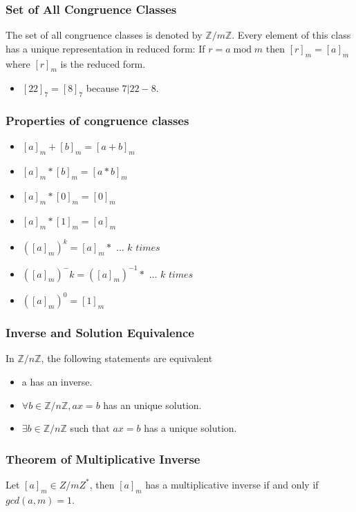 \documentclass{article}
\begin{document}
\subsubsection{Set of All Congruence Classes} 
\begin{tcolorbox}[width=12.1cm, leftrule=3mm]
The set of all congruence classes is denoted by $ \mathbb{Z} / m\mathbb{Z} $. Every element of this class has a unique representation in reduced form: If $ r = a \;\mathrm{mod}\; m $ then $ [r]_m = [a]_m $ where $ [r]_m $ is the reduced form.
\begin{itemize}
\item $ [22]_7 = [8]_7 $ because $ 7 | 22-8 $.
\end{itemize}
\end{tcolorbox}

\subsubsection{Properties of congruence classes}
\begin{itemize}
\item $ [a]_m + [b]_m = [a+b]_m $
\item $ [a]_m * [b]_m = [a*b]_m $
\item $ [a]_m * [0]_m = [0]_m $
\item $ [a]_m * [1]_m = [a]_m $
\item $ ([a]_m)^k = [a]_m * \textit{ ... k times } $
\item $ ([a]_m)^-k = ([a]_m)^{-1} * \textit{ ... k times } $
\item $ ([a]_m)^0 = [1]_m $
\end{itemize}

\subsubsection{Inverse and Solution Equivalence} In $ \mathbb{Z}/n\mathbb{Z} $, the following statements are equivalent
\begin{itemize}
\item a has an inverse.
\item $ \forall b \in \mathbb{Z}/n\mathbb{Z}, ax = b $ has an unique solution.
\item $ \exists b \in \mathbb{Z}/n\mathbb{Z} $ such that $ ax = b $ has a unique solution.
\end{itemize}

\subsubsection{Theorem of Multiplicative Inverse}
\begin{tcolorbox}[sharp corners, colback=green!30, colframe=green!80!blue, title=Existence of Multiplicative Inverse]
Let $ [a]_m \in Z/mZ^{*} $, then $ [a]_m $ has a multiplicative inverse if and only if $ gcd(a, m) = 1 $.
\end{tcolorbox}
\end{document}
